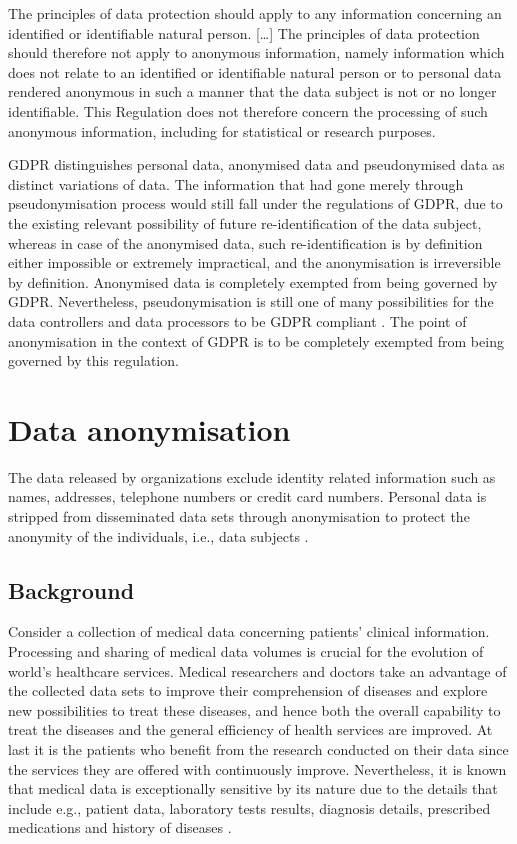 \documentclass[a4paper,twoside,12pt]{book}
\begin{document}
\begin{displayquote}
	The principles of data protection should apply to any information concerning an identified or identifiable natural person. [\ldots] The principles of data protection should therefore not apply to anonymous information, namely information which does not relate to an identified or identifiable natural person or to personal data rendered anonymous in such a manner that the data subject is not or no longer identifiable. This Regulation does not therefore concern the processing of such anonymous information, including for statistical or research purposes.
\end{displayquote}

GDPR distinguishes personal data, anonymised data and pseudonymised data as distinct variations of data. The information that had gone merely through pseudonymisation process would still fall under the regulations of GDPR, due to the existing relevant possibility of future re-identification of the data subject, whereas in case of the anonymised data, such re-identification is by definition either impossible or extremely impractical, and the anonymisation is irreversible by definition. Anonymised data is completely exempted from being governed by GDPR. Nevertheless, pseudonymisation is still one of many possibilities for the data controllers and data processors to be GDPR compliant \cite{bib:gdpr_practical_guide}. The point of anonymisation in the context of GDPR is to be completely exempted from being governed by this regulation.

\section{Data anonymisation}

The data released by organizations exclude identity related information such as names, addresses, telephone numbers or credit card numbers. Personal data is stripped from disseminated data sets through anonymisation to protect the anonymity of the individuals, i.e., data subjects \cite{bib:anonymization_extensive_study}.

\subsection{Background}
Consider a collection of medical data concerning patients' clinical information. Processing and sharing of medical data volumes is crucial for the evolution of world's healthcare services. Medical researchers and doctors take an advantage of the collected data sets to improve their comprehension of diseases and explore new possibilities to treat these diseases, and hence both the overall capability to treat the diseases and the general efficiency of health services are improved. At last it is the patients who benefit from the research conducted on their data since the services they are offered with continuously improve. Nevertheless, it is known that medical data is exceptionally sensitive by its nature due to the details that include e.g., patient data, laboratory tests results, diagnosis details, prescribed medications and history of diseases \cite{bib:anonymization_emr}.
\end{document}
